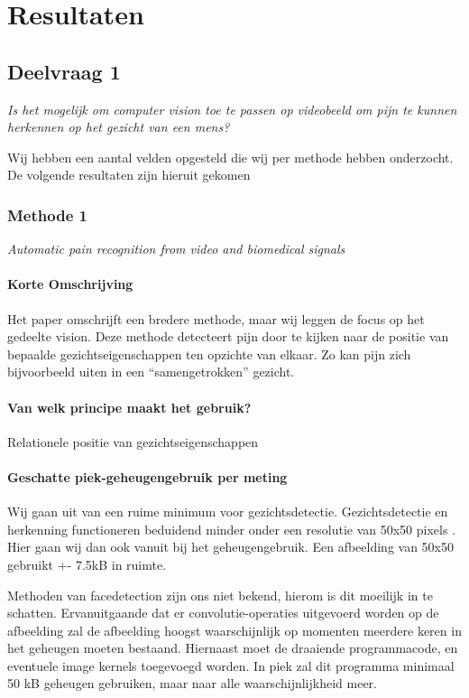 \documentclass[11pt]{article}
\begin{document}
    \section{Resultaten}

    \subsection{Deelvraag 1}
    \emph{Is het mogelijk om computer vision toe te passen op videobeeld om pijn te kunnen herkennen op het gezicht van een mens?}

    Wij hebben een aantal velden opgesteld die wij per methode hebben onderzocht. De volgende resultaten zijn hieruit gekomen

    \subsubsection{Methode 1}
    \emph{\citet{werner2014automatic} Automatic pain recognition from video and biomedical signals}

    \paragraph{Korte Omschrijving}
    Het paper omschrijft een bredere methode, maar wij leggen de focus op het gedeelte vision.
    Deze methode detecteert pijn door te kijken naar de positie van bepaalde gezichtseigenschappen ten opzichte van elkaar.
    Zo kan pijn zich bijvoorbeeld uiten in een “samengetrokken” gezicht.

    \paragraph{Van welk principe maakt het gebruik?}
    Relationele positie van gezichtseigenschappen

    \paragraph{Geschatte piek-geheugengebruik per meting}
    Wij gaan uit van een ruime minimum voor gezichtsdetectie.
    Gezichtsdetectie en herkenning functioneren beduidend minder onder een resolutie van 50x50 pixels \citet{boom2006effect}.
    Hier gaan wij dan ook vanuit bij het geheugengebruik.
    Een afbeelding van 50x50 gebruikt +- 7.5kB in ruimte.

    Methoden van facedetection zijn ons niet bekend, hierom is dit moeilijk in te schatten.
    Ervanuitgaande dat er convolutie-operaties uitgevoerd worden op de afbeelding zal de afbeelding hoogst waarschijnlijk op momenten meerdere keren in het geheugen moeten bestaand.
    Hiernaast moet de draaiende programmacode, en eventuele image kernels toegevoegd worden.
    In piek zal dit programma minimaal 50 kB geheugen gebruiken, maar naar alle waarschijnlijkheid meer.
\end{document}
